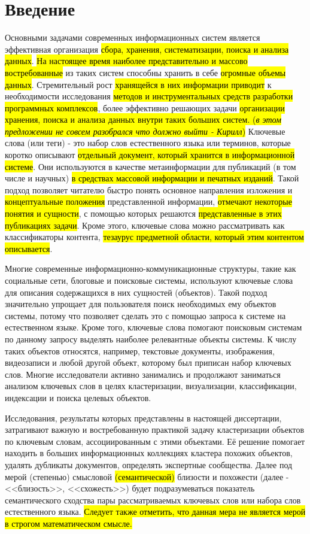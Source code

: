 \chapter*{Введение}							%
\nocite{*}
Основными задачами современных информационных систем является эффективная организация \hl{сбора, хранения, систематизации, поиска и анализа данных}.
\hl{На настоящее время наиболее представительно и массово востребованные} из таких систем способны хранить в себе \hl{огромные объемы данных}. Стремительный рост \hl{хранящейся в них информации приводит} к необходимости исследования \hl{методов и инструментальных средств разработки программных комплексов}, более эффективно решающих задачи \hl{организации хранения, поиска и анализа данных внутри таких больших систем. (\emph{в этом предложении не совсем разобрался что должно выйти - Кирилл})}
Ключевые слова (или теги) - это набор слов естественного языка или терминов, которые коротко описывают \hl{отдельный документ, который хранится в информационной системе}. Они используются в качестве метаинформации для публикаций (в том числе и научных) \hl{в средствах массовой информации и печатных изданий}. Такой подход позволяет читателю быстро понять основное направления изложения и \hl{концептуальные положения} представленной информации, \hl{отмечают некоторые понятия и сущности}, с помощью которых решаются \hl{представленные в этих публикациях задачи}. Кроме этого, ключевые слова можно рассматривать как классификаторы контента, \hl{тезаурус предметной области, который этим контентом описывается}.

Многие современные информационно-коммуникационные структуры, такие как социальные сети, блоговые и поисковые системы, используют ключевые слова для описания содержащихся в них сущностей (объектов). Такой подход значительно упрощает для пользователя поиск необходимых ему объектов системы, потому что позволяет сделать это с помощью запроса к системе на естественном языке.  Кроме того, ключевые слова помогают поисковым системам по данному запросу выделять наиболее релевантные объекты системы. К числу таких объектов относятся, например, текстовые документы, изображения, видеозаписи и любой другой объект, которому был приписан набор ключевых слов. Многие исследователи активно занимались и продолжают заниматься анализом ключевых слов в целях кластеризации, визуализации, классификации, индексации и поиска целевых объектов.

Исследования, результаты которых представлены в настоящей диссертации, затрагивают важную и востребованную практикой задачу кластеризации объектов по ключевым словам, ассоциированным с этими объектами. Её решение помогает находить в больших информационных коллекциях кластера похожих объектов, удалять дубликаты документов, определять экспертные сообщества. Далее под мерой (степенью) смысловой \hl{(семантической)} близости и похожести (далее - <<близость>>, <<схожесть>>) будет подразумеваться показатель семантического сходства пары рассматриваемых ключевых слов или набора слов естественного языка. \hl{Следует также отметить, что данная мера не является мерой в строгом математическом смысле.}

